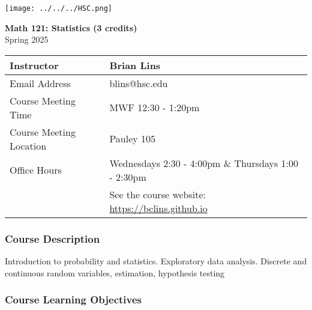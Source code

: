 \documentclass[10pt]{article}
\begin{document}
\noindent
%


\begin{center}
\texttt{[image: ../../../HSC.png]} 
\bigskip

\textbf{Math 121: Statistics (3 credits)} \\
Spring 2025
\end{center}

\noindent
\begin{tabular}{|l|l|}
\hline
Instructor & Brian Lins \\ \hline
Email Address & blins@hsc.edu \\ \hline
Course Meeting Time & MWF 12:30 - 1:20pm \\ \hline
Course Meeting Location & Pauley 105 \\ \hline
Office Hours & Wednesdays 2:30 - 4:00pm \& Thursdays 1:00 - 2:30pm \\ 
& See the course website: \url{https://bclins.github.io} ~ \\ \hline
\end{tabular}

\subsubsection*{Course Description}

Introduction to probability and statistics. Exploratory data analysis. Discrete and continuous random variables, estimation, hypothesis testing

\subsubsection*{Course Learning Objectives}
\end{document}

